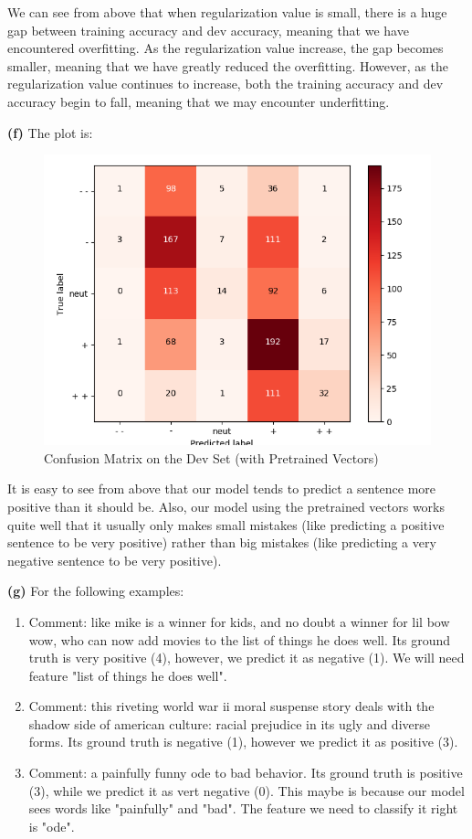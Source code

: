 \documentclass[10pt, a4paper]{ctexart}
\begin{document}
We can see from above that when regularization value is small, there is a huge gap between training accuracy and dev accuracy, meaning that we have encountered overfitting. As the regularization value increase, the gap becomes smaller, meaning that we have greatly reduced the overfitting. However, as the regularization value continues to increase, both the training accuracy and dev accuracy begin to fall, meaning that we may encounter underfitting.\par
{\bf{(f)}} The plot is:
\begin{figure}[H]
    \centering
    \includegraphics[width=0.7\linewidth]{../q4_dev_conf.png}
    \caption{Confusion Matrix on the Dev Set (with Pretrained Vectors)}
\end{figure}\par
It is easy to see from above that our model tends to predict a sentence more positive than it should be. Also, our model using the pretrained vectors works quite well that it usually only makes small mistakes (like predicting a positive sentence to be very positive) rather than big mistakes (like predicting a very negative sentence to be very positive).\par
{\bf{(g)}} For the following examples:
\begin{enumerate}
    \item Comment: like mike is a winner for kids, and no doubt a winner for lil bow wow, who can now add movies to the list of things he does well. Its ground truth is very positive (4), however, we predict it as negative (1). We will need feature "list of things he does well".
    \item Comment: this riveting world war ii moral suspense story deals with the shadow side of american culture: racial prejudice in its ugly and diverse forms. Its ground truth is negative (1), however we predict it as positive (3).
    \item Comment: a painfully funny ode to bad behavior. Its ground truth is positive (3), while we predict it as vert negative (0). This maybe is because our model sees words like "painfully" and "bad". The feature we need to classify it right is "ode".
\end{enumerate}
\end{document}
